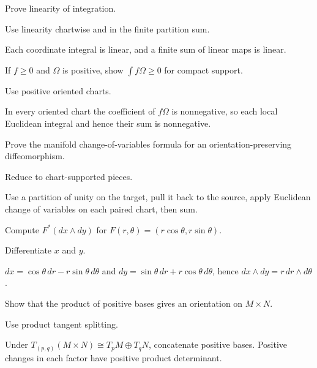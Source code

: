 \begin{exercise}\label{exr:vii10-17}
Prove linearity of integration.
\end{exercise}
\begin{hint}
Use linearity chartwise and in the finite partition sum.
\end{hint}
\begin{solution}
Each coordinate integral is linear, and a finite sum of linear maps is linear.
\end{solution}

\begin{exercise}\label{exr:vii10-18}
If $f\ge0$ and $\Omega$ is positive, show $\int f\Omega\ge0$ for compact support.
\end{exercise}
\begin{hint}
Use positive oriented charts.
\end{hint}
\begin{solution}
In every oriented chart the coefficient of $f\Omega$ is nonnegative, so each local Euclidean integral and hence their sum is nonnegative.
\end{solution}

\begin{exercise}\label{exr:vii10-19}
Prove the manifold change-of-variables formula for an orientation-preserving diffeomorphism.
\end{exercise}
\begin{hint}
Reduce to chart-supported pieces.
\end{hint}
\begin{solution}
Use a partition of unity on the target, pull it back to the source, apply Euclidean change of variables on each paired chart, then sum.
\end{solution}

\begin{exercise}\label{exr:vii10-20}
Compute $F^*(dx\wedge dy)$ for $F(r,\theta)=(r\cos\theta,r\sin\theta)$.
\end{exercise}
\begin{hint}
Differentiate $x$ and $y$.
\end{hint}
\begin{solution}
$dx=\cos\theta\,dr-r\sin\theta\,d\theta$ and $dy=\sin\theta\,dr+r\cos\theta\,d\theta$, hence $dx\wedge dy=r\,dr\wedge d\theta$.
\end{solution}

\begin{exercise}\label{exr:vii10-21}
Show that the product of positive bases gives an orientation on $M\times N$.
\end{exercise}
\begin{hint}
Use product tangent splitting.
\end{hint}
\begin{solution}
Under $T_{(p,q)}(M\times N)\cong T_pM\oplus T_qN$, concatenate positive bases. Positive changes in each factor have positive product determinant.
\end{solution}

